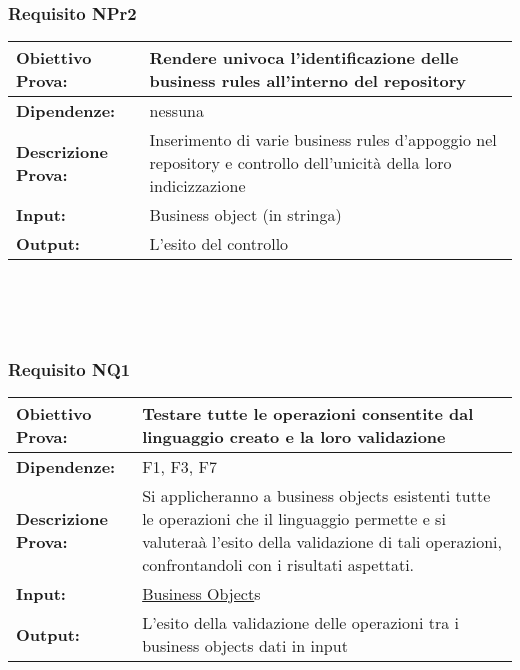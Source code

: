 \subsubsection{Requisito NPr2}
\begin{tabular}{||p{4cm}||p{8cm}||}
\hline
{\textbf{Obiettivo Prova:}}& Rendere univoca l'identificazione delle business rules all'interno del repository \\ \hline
{\textbf{Dipendenze:}}& nessuna \\ \hline
{\textbf{Descrizione Prova:}}& Inserimento di varie business rules d'appoggio nel repository e controllo dell'unicit\`a della loro indicizzazione \\ \hline
{\textbf{Input:}}& Business object (in stringa) \\ \hline 
{\textbf{Output:}}& L'esito del controllo\\ \hline
\end{tabular} \\
\\
\\
\subsubsection{Requisito NQ1}
\begin{tabular}{||p{4cm}||p{8cm}||}
\hline
{\textbf{Obiettivo Prova:}}& Testare tutte le operazioni consentite dal linguaggio creato e la loro validazione\\ \hline
{\textbf{Dipendenze:}}& F1, F3, F7 \\ \hline
{\textbf{Descrizione Prova:}}& Si applicheranno a business objects esistenti tutte le operazioni che il linguaggio permette e si valutera\`a l'esito della validazione di tali operazioni, confrontandoli con i risultati aspettati.  \\ \hline
{\textbf{Input:}}& \underline{Business Object}s \\ \hline
{\textbf{Output:}}& L'esito della validazione delle operazioni tra i business objects dati in input\\ \hline
\end{tabular} \\
\\
\\
